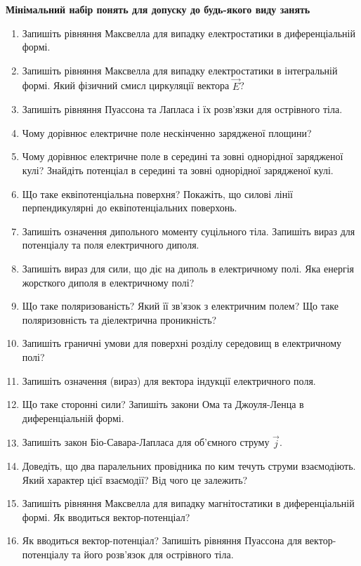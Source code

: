 \documentclass[12pt]{article}
\title{}
\author{}
\date{}
\begin{document}
\begin{center}\bfseries
Мінімальний набір понять для допуску до будь-якого виду занять
\end{center}

\begin{enumerate}
\item Запишіть рівняння Максвелла для випадку електростатики в диференціальній формі.
\item Запишіть рівняння Максвелла для випадку електростатики в інтегральній формі. Який фізичний смисл циркуляції вектора $\vec{E}$?
\item Запишіть рівняння Пуассона та Лапласа і їх розв'язки для острівного тіла.
\item Чому дорівнює електричне поле нескінченно зарядженої площини?
\item Чому дорівнює електричне поле в середині та зовні однорідної зарядженої кулі? Знайдіть потенціал в середині та зовні однорідної зарядженої кулі.
\item Що таке еквіпотенціальна поверхня? Покажіть, що силові лінії перпендикулярні до еквіпотенціальних поверхонь.
\item Запишіть означення дипольного моменту суцільного тіла. Запишіть вираз для потенціалу та поля електричного диполя.
\item Запишіть вираз для сили, що діє на диполь в електричному полі. Яка енергія жорсткого диполя в електричному полі?
\item Що таке поляризованість? Який її зв'язок з електричним полем? Що таке поляризовність та діелектрична проникність?
\item Запишіть граничні умови для поверхні розділу середовищ в електричному полі?
\item Запишіть означення (вираз) для вектора індукції електричного поля.
\item Що таке сторонні сили? Запишіть закони Ома та Джоуля-Ленца в диференціальній формі.
\item Запишіть закон Біо-Савара-Лапласа для об'ємного струму $\vec{j}$.
\item Доведіть, що два паралельних провідника по ким течуть струми взаємодіють. Який характер цієї взаємодії? Від чого це залежить?
\item Запишіть рівняння Максвелла для випадку магнітостатики в диференціальній формі. Як вводиться вектор-потенціал?
\item Як вводиться вектор-потенціал? Запишіть рівняння Пуассона для вектор-потенціалу та його розв'язок для острівного тіла.

\end{enumerate}
\end{document}
